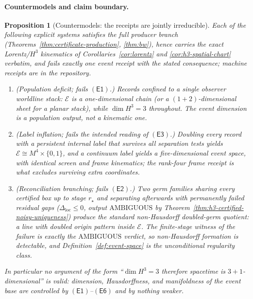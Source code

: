 \documentclass[11pt]{article}
\newtheorem{proposition}[theorem]{Proposition}
\begin{document}
\paragraph{Countermodels and claim boundary.}

\begin{proposition}[Countermodels: the receipts are jointly irreducible]
\label{prop:event-countermodels}
Each of the following explicit systems satisfies the full producer branch
(Theorems~\ref{thm:certificate-production}, \ref{thm:bw}), hence carries the
exact Lorentz/\(H^3\) kinematics of Corollaries~\ref{cor:lorentz} and
\ref{cor:h3-spatial-chart} verbatim, and fails exactly one event receipt with
the stated consequence; machine receipts are in the repository.
\begin{enumerate}[leftmargin=2em]
\item (\emph{Population deficit; fails \(\mathsf{(E1)}\).}) Records confined
to a single observer worldline stack: \(\mathcal E\) is a one-dimensional
chain (or a \((1{+}2)\)-dimensional sheet for a planar stack), while
\(\dim H^3=3\) throughout. The event dimension is a population output, not a
kinematic one.
\item (\emph{Label inflation; fails the intended reading of
\(\mathsf{(E3)}\).}) Doubling every record with a persistent internal label
that survives all separation tests yields
\(\mathcal E\cong M^4\times\{0,1\}\), and a continuum label yields a
five-dimensional event space, with identical screen and frame kinematics; the
rank-four frame receipt is what excludes surviving extra coordinates.
\item (\emph{Reconciliation branching; fails \(\mathsf{(E2)}\).}) Two germ
families sharing every certified box up to stage \(r_\star\) and separating
afterwards with permanently failed residual gaps
(\(\Delta_{\mathrm{loc}}\leq0\), output \(\mathrm{AMBIGUOUS}\) by
Theorem~\ref{thm:h3-certified-noisy-uniqueness}) produce the standard
non-Hausdorff doubled-germ quotient: a line with doubled origin pattern
inside \(\mathcal E\). The finite-stage witness of the failure is exactly the
\(\mathrm{AMBIGUOUS}\) verdict, so non-Hausdorff formation is detectable, and
Definition~\ref{def:event-space} is the unconditional regularity class.
\end{enumerate}
In particular no argument of the form ``\(\dim H^3=3\) therefore spacetime is
\(3{+}1\)-dimensional'' is valid: dimension, Hausdorffness, and manifoldness
of the event base are controlled by \(\mathsf{(E1)}\)--\(\mathsf{(E6)}\) and
by nothing weaker.
\end{proposition}
\end{document}
